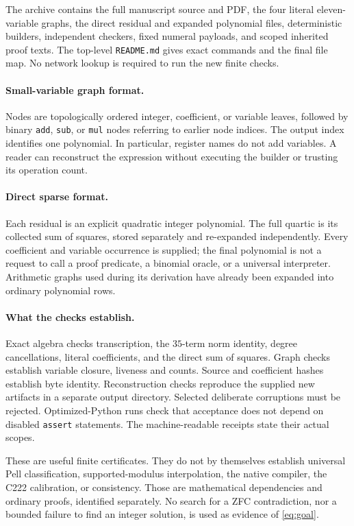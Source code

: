 \documentclass[11pt]{article}
\theoremstyle{definition}
\theoremstyle{remark}
\begin{document}
The archive contains the full manuscript source and PDF, the four
literal eleven-variable graphs, the direct residual and expanded
polynomial files, deterministic builders, independent checkers,
fixed numeral payloads, and scoped inherited proof texts. The
top-level \texttt{README.md} gives exact commands and the final
file map. No network lookup is required to run the new finite checks.

\paragraph{Small-variable graph format.}
Nodes are topologically ordered integer, coefficient, or variable
leaves, followed by binary \texttt{add}, \texttt{sub}, or
\texttt{mul} nodes referring to earlier node indices. The output
index identifies one polynomial. In particular, register names do
not add variables. A reader can reconstruct the expression without
executing the builder or trusting its operation count.

\paragraph{Direct sparse format.}
Each residual is an explicit quadratic integer polynomial. The
full quartic is its collected sum of squares, stored separately and
re-expanded independently. Every coefficient and variable occurrence
is supplied; the final polynomial is not a request to call a proof
predicate, a binomial oracle, or a universal interpreter. Arithmetic
graphs used during its derivation have already been expanded into
ordinary polynomial rows.

\paragraph{What the checks establish.}
Exact algebra checks transcription, the $35$-term norm identity,
degree cancellations, literal coefficients, and the direct sum of
squares. Graph checks establish variable closure, liveness and
counts. Source and coefficient hashes establish byte identity.
Reconstruction checks reproduce the supplied new artifacts in a
separate output directory. Selected deliberate corruptions must be
rejected. Optimized-Python runs check that acceptance does not
depend on disabled \texttt{assert} statements. The machine-readable
receipts state their actual scopes.

These are useful finite certificates. They do not by themselves
establish universal Pell classification, supported-modulus
interpolation, the native compiler, the C222 calibration, or
consistency. Those are mathematical dependencies and ordinary
proofs, identified separately. No search for a ZFC contradiction,
nor a bounded failure to find an integer solution, is used as
evidence of \eqref{eq:goal}.
\end{document}
